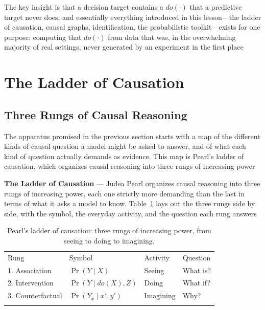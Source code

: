 The key insight is that a decision target contains a $do(\cdot)$ that a predictive
target never does, and essentially everything introduced in this lesson—the
ladder of causation, causal graphs, identification, the probabilistic toolkit—exists
for one purpose: computing that $do(\cdot)$ from data that was, in the overwhelming
majority of real settings, never generated by an experiment in the first place

\section{The Ladder of Causation}
\label{sec:the-ladder-of-causation}

\subsection{Three Rungs of Causal Reasoning}
\label{subsec:three-rungs-of-causal-reasoning}

The apparatus promised in the previous section starts with a map of the different
kinds of causal question a model might be asked to answer, and of what each kind
of question actually demands as evidence. This map is Pearl's ladder of causation,
which organizes causal reasoning into three rungs of increasing power

\textbf{The Ladder of Causation} --- Judea Pearl organizes causal reasoning into
three rungs of increasing power, each one strictly more demanding than the last in
terms of what it asks a model to know. Table~\ref{tab:ladder-of-causation} lays
out the three rungs side by side, with the symbol, the everyday activity, and the
question each rung answers

\begin{table}[!t]
  \caption{Pearl's ladder of causation: three rungs of increasing power, from
  seeing to doing to imagining.}
  \label{tab:ladder-of-causation}
  \begin{tabular}{p{2.3cm}p{3.4cm}p{2.0cm}p{2.6cm}}
    \hline
    \noalign{\smallskip} Rung                                       & Symbol                  & Activity  & Question \\
    \noalign{\smallskip}\svhline\noalign{\smallskip} 1. Association & $\Pr(Y \mid X)$         & Seeing    & What is? \\
    2. Intervention                                                 & $\Pr(Y \mid do(X), Z)$  & Doing     & What if? \\
    3. Counterfactual                                               & $\Pr(Y_{x}\mid x', y')$ & Imagining & Why?     \\
    \noalign{\smallskip}                                             \hline
    \noalign{\smallskip}
  \end{tabular}
\end{table}

